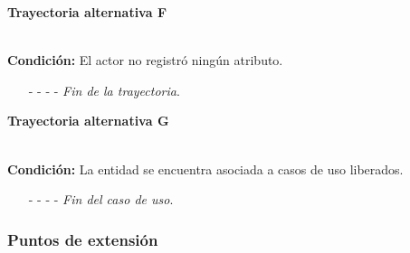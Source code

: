 \hypertarget{CU7-2:TAF}{\textbf{Trayectoria alternativa F}}\\
\noindent \textbf{Condición:} El actor no registró ningún atributo.
\begin{enumerate}
	\UCpaso[\UCsist] Muestra el mensaje  en la sección de atributos de la pantalla .
	\UCpaso Regresa al paso \ref{CU7.2-P5} de la trayectoria principal.
	\item[- -] - - {\em {Fin de la trayectoria}}.
\end{enumerate}
\hypertarget{CU7-2:TAG}{\textbf{Trayectoria alternativa G}}\\
\noindent \textbf{Condición:} La entidad se encuentra asociada a casos de uso liberados.
\begin{enumerate}
	\UCpaso[\UCsist] Oculta el botón \editar de la entidad que esta asociada a casos de uso liberados.
	\item[- -] - - {\em {Fin del caso de uso}}.
\end{enumerate}

\subsubsection{Puntos de extensión}


